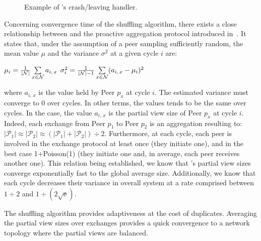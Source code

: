 \begin{figure*}
  \centering
  \hspace{10pt}
  \hspace{10pt}
  \caption{\label{fig:crashexample}Example of \SPRAY's crash/leaving
    handler. }
\end{figure*}

Concerning convergence time of the shuffling algorithm, there exists a close
relationship between \SPRAY and the proactive aggregation protocol introduced
in~\cite{jelasity2004epidemic,montresor2004robust}. It states that, under the
assumption of a peer sampling sufficiently random, the mean value $\mu$ and the
variance $\sigma^2$ at a given cycle $i$ are:
\begin{center}
  $\mu_i = {1\over{|\mathcal{N}|}} \sum\limits_{x \in \mathcal{N}} a_{i,\,x}$
  \hfill
  $\sigma^2_i = {1\over{|\mathcal{N}|-1}}\sum\limits_{x \in \mathcal{N}}
  (a_{i,\,x} - \mu_i)^2$
\end{center}
where $a_{i,\,x}$ is the value held by Peer $p_x$ at cycle $i$. The estimated
variance must converge to $0$ over cycles. In other terms, the values tends to
be the same over cycles. In the \SPRAY case, the value $a_{i,\,x}$ is the
partial view size of Peer $p_x$ at cycle $i$. Indeed, each exchange from Peer
$p_1$ to Peer $p_2$ is an aggregation resulting to:
$|\mathcal{P}_1|\approx|\mathcal{P}_2|\approx{(|\mathcal{P}_1| +
  |\mathcal{P}_2|) \div 2}$.
Furthermore, at each cycle, each peer is involved in the exchange protocol at
least once (they initiate one), and in the best case 1+Poisson(1) (they
initiate one and, in average, each peer receives another one). This relation
being established, we know that \SPRAY's partial view sizes converge
exponentially fast to the global average size. Additionally, we know that each
cycle decreases their variance in overall system at a rate comprised between
${1\div 2}$ and $1\div ({2\sqrt{\text{e}}})$.

The shuffling algorithm provides adaptiveness at the cost of
duplicates. Averaging the partial view sizes over exchanges provides a quick
convergence to a network topology where the partial views are balanced.

